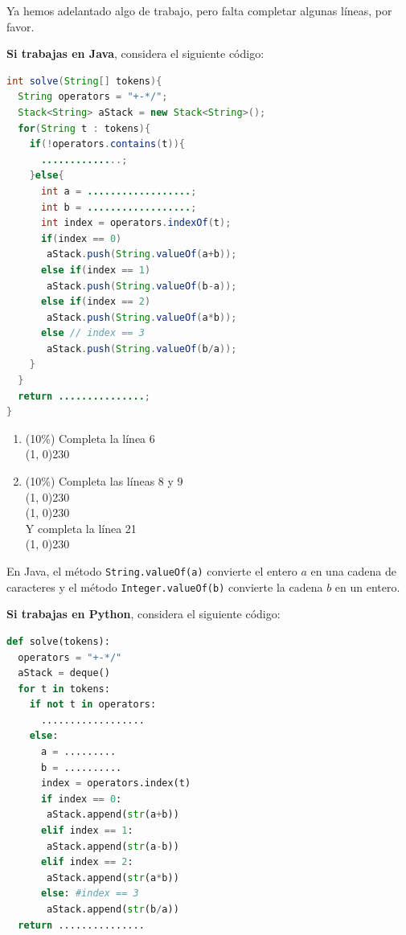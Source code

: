 \documentclass[10 pt]{article}
\begin{document}
Ya hemos adelantado algo de trabajo, pero falta completar algunas líneas, por favor.

\hspace{1 cm}

\textbf{Si trabajas en Java}, considera el siguiente código:

\begin{lstlisting}[language = Java]
int solve(String[] tokens){
  String operators = "+-*/";
  Stack<String> aStack = new Stack<String>();
  for(String t : tokens){
    if(!operators.contains(t)){
      ..............;
    }else{
      int a = ..................;
      int b = ..................;
      int index = operators.indexOf(t);
      if(index == 0) 
       aStack.push(String.valueOf(a+b));
      else if(index == 1)
       aStack.push(String.valueOf(b-a));
      else if(index == 2)
       aStack.push(String.valueOf(a*b));
      else // index == 3
       aStack.push(String.valueOf(b/a));
    }
  }
  return ...............;
}
\end{lstlisting}
\begin{enumerate}[label=(\Alph*)]
 
  \item (10\%) Completa la línea 6\\
  \line(1, 0){230}\\
  \item (10\%) Completa las líneas 8 y 9\\
  \line(1, 0){230} \\
  \line(1, 0){230}\\
  Y completa la línea 21\\
  \line(1, 0){230}
\end{enumerate}

En Java, el método \texttt{String.valueOf(a)} convierte el entero $a$ en una cadena de caracteres y el método \texttt{Integer.valueOf(b)} convierte la cadena $b$ en un entero.

\newpage

\textbf{Si trabajas en Python}, considera el siguiente código:

\begin{lstlisting}[language = Python]
def solve(tokens):
  operators = "+-*/"
  aStack = deque()
  for t in tokens:
    if not t in operators:
      ..................
    else:
      a = .........
      b = ..........
      index = operators.index(t)
      if index == 0:
       aStack.append(str(a+b))
      elif index == 1:
       aStack.append(str(a-b))
      elif index == 2:
       aStack.append(str(a*b))
      else: #index == 3
       aStack.append(str(b/a))
  return ...............
\end{lstlisting}
\end{document}
